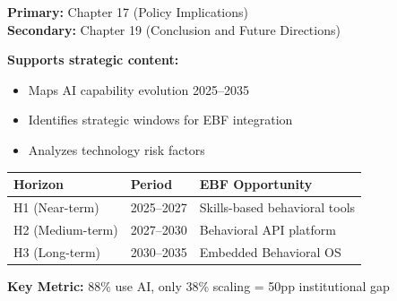 
\begin{tcolorbox}[colback=green!5!white, colframe=green!75!black,
    title=\textbf{Chapter Linkage}]

\textbf{Primary:} Chapter 17 (Policy Implications) \\
\textbf{Secondary:} Chapter 19 (Conclusion and Future Directions)

\textbf{Supports strategic content:}
\begin{itemize}[nosep]
    \item Maps AI capability evolution 2025--2035
    \item Identifies strategic windows for EBF integration
    \item Analyzes technology risk factors
\end{itemize}

\end{tcolorbox}


\begin{abstract}
This appendix provides a technology-centric foundation for EBF strategic planning,
mapping current AI capabilities, projected development trajectories, and
implications for behavioral science integration through 2035. Key findings:
(1) Foundation model capabilities are production-ready for text/code but
experimental for agentic execution; (2) The 2025--2027 window represents
the optimal entry point before behavioral capabilities become platform-native;
(3) The transition from GPTs to Skills to Behavioral OS creates distinct
strategic opportunities at each phase.
\end{abstract}


\begin{tcolorbox}[colback=blue!5!white, colframe=blue!75!black,
    title=\textbf{Quick Reference: Technology Phases}]

\begin{tabular}{@{}lll@{}}
\textbf{Horizon} & \textbf{Period} & \textbf{EBF Opportunity} \\
\hline
H1 (Near-term) & 2025--2027 & Skills-based behavioral tools \\
H2 (Medium-term) & 2027--2030 & Behavioral API platform \\
H3 (Long-term) & 2030--2035 & Embedded Behavioral OS \\
\end{tabular}

\textbf{Key Metric:} 88\% use AI, only 38\% scaling = 50pp institutional gap

\end{tcolorbox}

